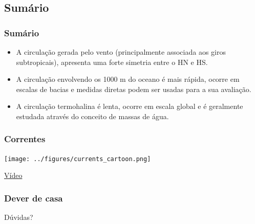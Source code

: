 \subsection{Sumário}
\begin{frame}
\frametitle{Sumário}
  \begin{itemize}[<+-| alert@+>]
    \item A circulação gerada pelo vento (principalmente associada aos giros
          subtropicais), apresenta uma forte simetria entre o HN e HS.
    \item A circulação envolvendo os 1000 m do oceano é mais rápida, ocorre em
          escalas de bacias e medidas diretas podem ser usadas para a sua
          avaliação.
    \item A circulação termohalina é lenta, ocorre em escala global e é
          geralmente estudada através do conceito de massas de água.
  \end{itemize}
\end{frame}


\begin{frame}
  \frametitle{Correntes}
  \begin{center}
    \texttt{[image: ../figures/currents\_cartoon.png]}
  \end{center}
  \href{http://www.youtube.com/watch?v=BtCwjfU2Rro}{Vídeo}
\end{frame}


\begin{frame}
  \frametitle{Dever de casa}
  \pause
    Dúvidas?
\end{frame}


